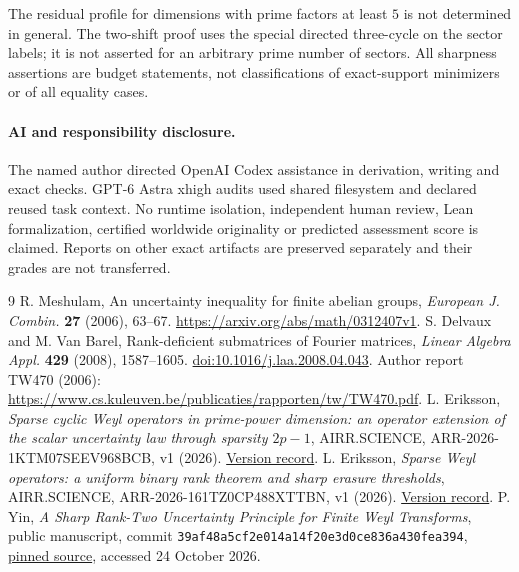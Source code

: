 \documentclass[11pt,a4paper]{article}
\theoremstyle{remark}\newtheorem{remark}[theorem]{Remark}
\begin{document}
The residual profile for dimensions with prime factors at least $5$ is
not determined in general. The two-shift proof uses the special directed
three-cycle on the sector labels; it is not asserted for an arbitrary
prime number of sectors. All sharpness assertions are budget statements,
not classifications of exact-support minimizers or of all equality cases.

\paragraph{AI and responsibility disclosure.}
The named author directed OpenAI Codex assistance in derivation, writing
and exact checks. GPT-6 Astra xhigh audits used shared filesystem and
declared reused task context. No runtime isolation, independent human
review, Lean formalization, certified worldwide originality or predicted
assessment score is claimed. Reports on other exact artifacts are
preserved separately and their grades are not transferred.

\begin{thebibliography}{9}
R. Meshulam, An uncertainty inequality for finite abelian groups,
\emph{European J. Combin.} \textbf{27} (2006), 63--67.
\url{https://arxiv.org/abs/math/0312407v1}.
S. Delvaux and M. Van Barel, Rank-deficient submatrices of Fourier matrices,
\emph{Linear Algebra Appl.} \textbf{429} (2008), 1587--1605.
\href{https://doi.org/10.1016/j.laa.2008.04.043}{doi:10.1016/j.laa.2008.04.043}.
Author report TW470 (2006):
\url{https://www.cs.kuleuven.be/publicaties/rapporten/tw/TW470.pdf}.
L. Eriksson, \emph{Sparse cyclic Weyl operators in prime-power dimension:
an operator extension of the scalar uncertainty law through sparsity
$2p-1$}, AIRR.SCIENCE, ARR-2026-1KTM07SEEV968BCB, v1 (2026).
\href{https://airr.science/papers/ARR-2026-1KTM07SEEV968BCB/versions/v1/}{Version record}.
L. Eriksson, \emph{Sparse Weyl operators: a uniform binary rank theorem
and sharp erasure thresholds}, AIRR.SCIENCE,
ARR-2026-161TZ0CP488XTTBN, v1 (2026).
\href{https://airr.science/papers/ARR-2026-161TZ0CP488XTTBN/versions/v1/}{Version record}.
P. Yin, \emph{A Sharp Rank-Two Uncertainty Principle for Finite Weyl
Transforms}, public manuscript, commit
\texttt{39af48a5cf2e014a14f20e3d0ce836a430fea394},
\href{https://github.com/holdonyb/weyl-stft-paper/blob/39af48a5cf2e014a14f20e3d0ce836a430fea394/research/manuscript.tex}{pinned source},
accessed 24 October 2026.
\end{thebibliography}
\end{document}

